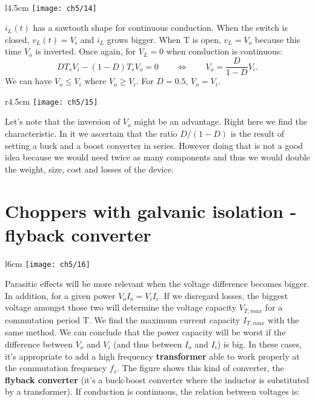 		\ \\
		\begin{wrapfigure}[8]{l}{4.5cm}
		\vspace{-5mm}
		\texttt{[image: ch5/14]}
		\end{wrapfigure}	
		$i_L(t)$ has a sawtooth shape for continuous conduction. When the switch is closed, $v_L(t) = V_i$ and $i_L$ grows bigger. When T is open, $v_L = V_o$ because this time $V_o$ is inverted. Once again, for $V_L = 0$ when conduction is continuous: 
		\begin{equation}
			DT_s V_i - (1-D)T_s V_o = 0 \qquad \Leftrightarrow \qquad V_o = \frac{D}{1-D}V_i.
		\end{equation}
		We can have $V_o \leq V_i$ where $V_o \geq V_i$. For $D = 0.5$, $V_o =V_i.$ \\ 
		
		\begin{wrapfigure}[6]{r}{4.5cm}
		\vspace{-5mm}
		\texttt{[image: ch5/15]}
		\end{wrapfigure}
		Let's note that the inversion of $V_o$ might be an advantage. Right here we find the characteristic. In it we ascertain that the ratio $D/(1-D)$ is the result of setting a buck and a boost converter in series. However doing that is not a good idea because we would need twice as many components and thus we would double the weight, size, cost and losses of the device.

		
\section{Choppers with galvanic isolation - flyback converter}
	\begin{wrapfigure}[7]{l}{6cm}
	\vspace{-5mm}
	\texttt{[image: ch5/16]}
	\end{wrapfigure}
	Parasitic effects will be more relevant when the voltage difference becomes bigger. In addition, for a given power $V_oI_o = V_iI_i$. If we disregard losses, the biggest voltage amongst those two will determine the voltage capacity $V_{T,max}$ for a commutation period T. We find the maximum current capacity $I_{T,max}$ with the same method. We can conclude that the power capacity will be worst if the difference between $V_o$ and $V_i$ (and thus between $I_o$ and $I_i$) is big. In these cases, it's appropriate to add a high frequency \textbf{transformer} able to work properly at the commutation frequency $f_s$. The figure shows this kind of converter, the \textbf{flyback converter} (it's a buck-boost converter where the inductor is substituted by a transformer). If conduction is continuous, the relation between voltages is:
	
